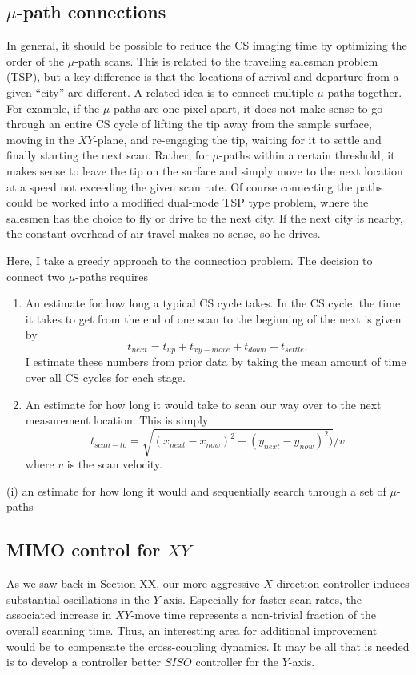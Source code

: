 \documentclass[11pt]{article}
\begin{document}
\subsection{$\mu$-path connections}
In general, it should be possible to reduce the CS imaging time by optimizing the order of the $\mu$-path scans. This is related to the traveling salesman problem (TSP), but a key difference is that the locations of arrival and departure from a given ``city'' are different. A related idea is to connect multiple $\mu$-paths together. For example, if the $\mu$-paths are one pixel apart, it does not make sense to go through an entire CS cycle of lifting the tip away from the sample surface, moving in the $XY$-plane, and re-engaging the tip, waiting for it to settle and finally starting the next scan. Rather, for $\mu$-paths within a certain threshold, it makes sense to leave the tip on the surface and simply move to the next location at a speed not exceeding the given scan rate. Of course connecting the paths could be worked into a modified dual-mode TSP type problem, where the salesmen has the choice to fly or drive to the next city. If the next city is nearby, the constant overhead of air travel makes no sense, so he drives.

Here, I take a greedy approach to the connection problem. The decision to connect two $\mu$-paths requires
\begin{enumerate}
\item An estimate for how long a typical CS cycle takes. In the CS cycle, the time it takes to get from the end of one scan to the beginning of the next is given by
  \begin{equation}
    t_{next} = t_{up} + t_{xy-move} + t_{down} + t_{settle}.
  \end{equation}
  I estimate these numbers from prior data by taking the mean amount of time over all CS cycles for each stage.
\item An estimate for how long it would take to scan our way over to the next measurement location. This is simply
  \begin{equation}
    t_{scan-to} = \sqrt{(x_{next}-x_{now})^2 + (y_{next}-y_{now})^2) }/ v
    \end{equation}
    where $v$ is the scan velocity.
\end{enumerate}
(i) an estimate for how long it would and sequentially search through a set of $\mu$-paths

\subsection{MIMO control for $XY$}
As we saw back in Section XX, our more aggressive $X$-direction controller induces substantial oscillations in the $Y$-axis. Especially for faster scan rates, the associated increase in $XY$-move time represents a non-trivial fraction of the overall scanning time. Thus, an interesting area for additional improvement would be to compensate the cross-coupling dynamics. It may be all that is needed is to develop a controller better $SISO$ controller for the $Y$-axis.




\end{document}
